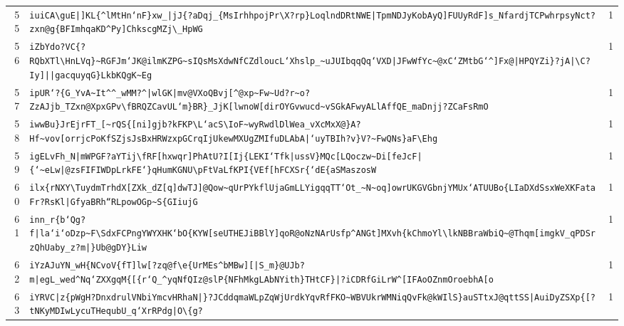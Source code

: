 \begin{xltabular}{\textwidth}{@{} r >{\raggedright\arraybackslash}X r @{}}
        55 & \texttt{iuiCA\textbackslash{}guE|]KL\{\textasciicircum{}lMtHn`nF\}xw\_|jJ\{?aDqj\_\{MsIrhhpojPr\textbackslash{}X?rp\}LoqlndDRtNWE|TpmNDJyKobAyQ]FUUyRdF]s\_NfardjTCPwhrpsyNct?zxn@g\{BFImhqaKD\textasciicircum{}Py]ChkscgMZj\textbackslash{}\_HpWG} & 1 \\
        56 & \texttt{iZbYdo?VC\{?RQbXTl\textbackslash{}HnLVq\}\textasciitilde{}RGFJm`JK@ilmKZPG\textasciitilde{}sIQsMsXdwNfCZdloucL`Xhslp\_\textasciitilde{}uJUIbqqQq`VXD|JFwWfYc\textasciitilde{}@xC`ZMtbG`\textasciicircum{}]Fx@|HPQYZi\}?jA|\textbackslash{}C?Iy]||gacquyqG\}LkbKQgK\textasciitilde{}Eg} & 1 \\
        57 & \texttt{ipUR`?\{G\_YvA\textasciitilde{}It\textasciicircum{}\textasciicircum{}\_wMM?\textasciicircum{}|wlGK|mv@VXoQBvj[\textasciicircum{}@xp\textasciitilde{}Fw\textasciitilde{}Ud?r\textasciitilde{}o?ZzAJjb\_TZxn@XpxGPv\textbackslash{}fBRQZCavUL`m\}BR\}\_JjK[lwnoW[dirOYGvwucd\textasciitilde{}vSGkAFwyALlAffQE\_maDnjj?ZCaFsRmO} & 1 \\
        58 & \texttt{iwwBu\}JrEjrFT\_[\textasciitilde{}rQS\{[ni]gjb?kFKP\textbackslash{}L`acS\textbackslash{}IoF\textasciitilde{}wyRwdlDlWea\_vXcMxX@\}A?Hf\textasciitilde{}vov[orrjcPoKfSZjsJsBxHRWzxpGCrqIjUkewMXUgZMIfuDLAbA|`uyTBIh?v\}V?\textasciitilde{}FwQNs\}aF\textbackslash{}Ehg} & 1 \\
        59 & \texttt{igELvFh\_N|mWPGF?aYTij\textbackslash{}fRF[hxwqr]PhAtU?I[Ij\{LEKI`Tfk|ussV\}MQc[LQoczw\textasciitilde{}Di[feJcF|\{`\textasciitilde{}eLw|@zsFIFIWDpLrkFE`\}qHumKGNU\textbackslash{}pFtVaLfKPI\{VEf[hFCXSr\{`dE\{aSMaszosW} & 1 \\
        60 & \texttt{ilx\{rNXY\textbackslash{}TuydmTrhdX[ZXk\_dZ[q]dwTJ]@Qow\textasciitilde{}qUrPYkflUjaGmLLYigqqTT`Ot\_\textasciitilde{}N\textasciitilde{}oq]owrUKGVGbnjYMUx`ATUUBo\{LIaDXdSsxWeXKFataFr?RsKl|GfyaBRh``RLpowOGp\textasciitilde{}S\{GIiujG} & 1 \\
        61 & \texttt{inn\_r\{b`Qg?f|la`i`oDzp\textasciitilde{}F\textbackslash{}SdxFCPngYWYXHK`bO\{KYW[seUTHEJiBBlY]qoR@oNzNArUsfp\textasciicircum{}ANGt]MXvh\{kChmoYl\textbackslash{}lkNBBraWbiQ\textasciitilde{}@Thqm[imgkV\_qPDSrzQhUaby\_z?m|\}Ub@gDY\}Liw} & 1 \\
        62 & \texttt{iYzAJuYN\_wH\{NCvoV\{fT]lw[?zq@f\textbackslash{}e\{UrMEs\textasciicircum{}bMBw][|S\_m\}@UJb?m|egL\_wed\textasciicircum{}Nq`ZXXgqM\{[\{r`Q\_\textasciicircum{}yqNfQIz@slP\{NFhMkgLAbNYith\}THtCF\}|?iCDRfGiLrW\textasciicircum{}[IFAoOZnmOroebhA[o} & 1 \\
        63 & \texttt{iYRVC|z\{pWgH?DnxdrulVNbiYmcvHRhaN|\}?JCddqmaWLpZqWjUrdkYqvRfFKO\textasciitilde{}WBVUkrWMNiqQvFk@kWIlS\}auSTtxJ@qttSS|AuiDyZSXp\{[?tNKyMDIwLycuTHequbU\_q`XrRPdg|O\textbackslash{}\{g?} & 1 \\

\end{xltabular}
